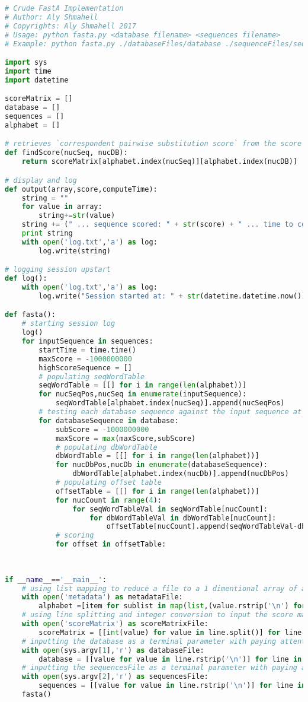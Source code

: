 \documentclass[12pt]{article}
\begin{document}
\begin{lstlisting}[language=Python]
# Crude FastA Implementation
# Author: Aly Shmahell
# Copyrights: Aly Shmahell 2017
# Usage: python fasta.py <database filename> <sequences filename>
# Example: python fasta.py ./databaseFiles/database ./sequenceFiles/sequences

import sys
import time
import datetime

scoreMatrix = []
database = []
sequences = []
alphabet = []

# retrieves `correspondent pairwise substitution score` from the score matrix
def findScore(nucSeq, nucDB):
	return scoreMatrix[alphabet.index(nucSeq)][alphabet.index(nucDB)]

# display and log
def output(array,score,computeTime):
	string = ""
	for value in array:
		string+=str(value)
	string += (" ... sequence scored: " + str(score) + " ... time to compute: " + str(computeTime) + " seconds \n")
	print string
	with open('log.txt','a') as log:
		log.write(string)

# logging session upstart
def log():
	with open('log.txt','a') as log:
		log.write("Session started at: " + str(datetime.datetime.now()) + "\n")

def fasta():
	# starting session log
	log()
	for inputSequence in sequences:
		startTime = time.time()
		maxScore = -1000000000
		highScoreSequence = []
		# populating seqWordTable
		seqWordTable = [[] for i in range(len(alphabet))]
		for nucSeqPos,nucSeq in enumerate(inputSequence):
			seqWordTable[alphabet.index(nucSeq)].append(nucSeqPos)
		# testing each database sequence against the input sequence at hand
		for databaseSequence in database:
			subScore = -1000000000
			maxScore = max(maxScore,subScore)
			# populating dbWordTable
			dbWordTable = [[] for i in range(len(alphabet))]
			for nucDbPos,nucDb in enumerate(databaseSequence):
				dbWordTable[alphabet.index(nucDb)].append(nucDbPos)
			# populating offset table
			offsetTable = [[] for i in range(len(alphabet))]
			for nucCount in range(4):
				for seqWordTableVal in seqWordTable[nucCount]:
					for dbWordTableVal in dbWordTable[nucCount]:
						offsetTable[nucCount].append(seqWordTableVal-dbWordTableVal)
			# scoring
			for offset in offsetTable:
				
			
	
if __name__=='__main__':
	# using list mapping to reduce a file to a 1 dimentional array of alphabet
	with open('metadata') as metadataFile:
		alphabet =[item for sublist in map(list,(value.rstrip('\n') for value in metadataFile)) for item in sublist]
	# using line splitting and integer conversion to input the score matrix
	with open('scoreMatrix') as scoreMatrixFile:
		scoreMatrix = [[int(value) for value in line.split()] for line in scoreMatrixFile]
	# inputting the database as a terminal parameter with paying attention to new lines
	with open(sys.argv[1],'r') as databaseFile:
		database = [[value for value in line.rstrip('\n')] for line in databaseFile]
	# inputting the sequencesFile as a terminal parameter with paying attention to new lines
	with open(sys.argv[2],'r') as sequencesFile:
		sequences = [[value for value in line.rstrip('\n')] for line in sequencesFile]
	fasta()
\end{lstlisting}
\end{document}

